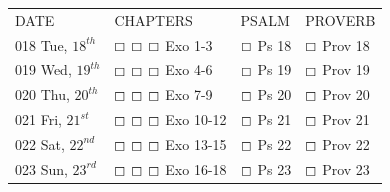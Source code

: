 \documentclass[10pt,landscape,twocolumn,letterpaper]{article}
\begin{document}
\begin{tabular}{p{0.8in}p{1.3in}p{1.2in}p{1.2in}}
DATE & CHAPTERS & PSALM & PROVERB \\
\tiny 018 \normalsize Tue, $18^{th}$ & $\boxempty$ $\boxempty$ $\boxempty$ \hspace{.05in} \textcolor[rgb]{1.00,0.00,0.00}{Exo 1-3} & $\boxempty$ \hspace{.05in} \textcolor[rgb]{0.00,1.00,0.00}{Ps 18} &  $\boxempty$ \hspace{.05in} \textcolor[rgb]{0.00,0.00,1.00}{Prov 18}   \\

\tiny 019 \normalsize Wed, $19^{th}$ & $\boxempty$ $\boxempty$ $\boxempty$ \hspace{.05in} \textcolor[rgb]{1.00,0.00,0.00}{Exo 4-6} & $\boxempty$ \hspace{.05in} \textcolor[rgb]{0.00,1.00,0.00}{Ps 19} & $\boxempty$ \hspace{.05in} \textcolor[rgb]{0.00,0.00,1.00}{Prov 19}  \\

\tiny 020 \normalsize Thu, $20^{th}$ & $\boxempty$ $\boxempty$ $\boxempty$ \hspace{.05in}  \textcolor[rgb]{1.00,0.00,0.00}{Exo 7-9} & $\boxempty$ \hspace{.05in} \textcolor[rgb]{0.00,1.00,0.00}{Ps 20} & $\boxempty$ \hspace{.05in} \textcolor[rgb]{0.00,0.00,1.00}{Prov 20}  \\

\tiny 021 \normalsize Fri, $21^{st}$ & $\boxempty$ $\boxempty$ $\boxempty$ \hspace{.05in}  \textcolor[rgb]{1.00,0.00,0.00}{Exo 10-12} & $\boxempty$ \hspace{.05in} \textcolor[rgb]{0.00,1.00,0.00}{Ps 21} & $\boxempty$ \hspace{.05in} \textcolor[rgb]{0.00,0.00,1.00}{Prov 21}  \\

\tiny 022 \normalsize Sat, $22^{nd}$ & $\boxempty$ $\boxempty$ $\boxempty$ \hspace{.05in} \textcolor[rgb]{1.00,0.00,0.00}{Exo 13-15} & $\boxempty$ \hspace{.05in} \textcolor[rgb]{0.00,1.00,0.00}{Ps 22} & $\boxempty$ \hspace{.05in} \textcolor[rgb]{0.00,0.00,1.00}{Prov 22}  \\

\tiny 023 \normalsize Sun, $23^{rd}$ & $\boxempty$ $\boxempty$ $\boxempty$ \hspace{.05in} \textcolor[rgb]{1.00,0.00,0.00}{Exo 16-18} & $\boxempty$ \hspace{.05in} \textcolor[rgb]{0.00,1.00,0.00}{Ps 23} & $\boxempty$ \hspace{.05in} \textcolor[rgb]{0.00,0.00,1.00}{Prov 23}  \\


\end{tabular}
\end{document}
